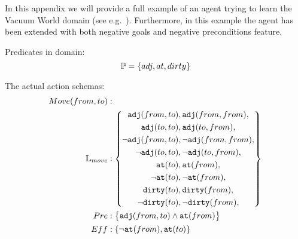 \documentclass[\master/Master.tex]{subfiles}
\begin{document}
In this appendix we will provide a full example of an agent trying to learn the Vacuum World domain (see e.g.\ \cite{Russell}). 
Furthermore, in this example the agent has been extended with both negative goals and negative preconditions feature.

Predicates in domain: 
\begin{equation*}
	\mathbb{P} = \{adj,at,dirty\}
\end{equation*}

The actual action schemas:
\begin{align*}
	Move(from,to) &: \\
	\mathbb{L}_{move} &: 
			\left\{
				\begin{gathered}
					\texttt{adj}(from,to), \texttt{adj}(from,from), \\
					\texttt{adj}(to,to), \texttt{adj}(to,from), \\
					\neg \texttt{adj}(from,to), \neg \texttt{adj}(from,from), \\
					\neg \texttt{adj}(to,to), \neg \texttt{adj}(to,from), \\					
					\texttt{at}(to), \texttt{at}(from), \\
					\neg \texttt{at}(to), \neg \texttt{at}(from), \\					
					\texttt{dirty}(to), \texttt{dirty}(from), \\
					\neg \texttt{dirty}(to), \neg \texttt{dirty}(from), \\
				\end{gathered}
				\right\}
				\\
	Pre &: \left\{
	\begin{gathered}
		\texttt{adj}(from,to) \land \texttt{at}(from)\\
    \end{gathered} \right\}
	\\
	Eff &: \{
	\begin{gathered}
		\neg \texttt{at}(from), \texttt{at}(to)\\
	\end{gathered}\}
	\\
\end{align*}
\end{document}
